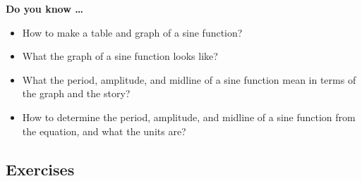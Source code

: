 

\noindent \textbf{Do you know \ldots}

\begin{itemize}
\item How to make a table and graph of a sine function?
\item What the graph of a sine function looks like?
\item What the period, amplitude, and midline of a sine function mean in terms of the graph and the story?
\item How to determine the period, amplitude, and midline of a sine function from the equation, and what the units are?

  
\end{itemize}

\subsection*{Exercises}

